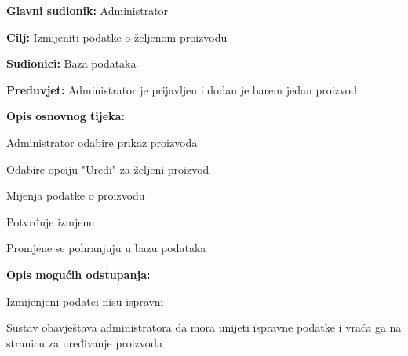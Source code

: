 					\noindent {}
					\begin{packed_item}
						
						\item \textbf{Glavni sudionik:} Administrator
						\item  \textbf{Cilj:} Izmijeniti podatke o željenom proizvodu
						\item  \textbf{Sudionici:} Baza podataka
						\item  \textbf{Preduvjet:} Administrator je prijavljen i dodan je barem jedan proizvod
						\item  \textbf{Opis osnovnog tijeka:}
						
						\item[] \begin{packed_enum}
							
							\item Administrator odabire prikaz proizvoda
							\item Odabire opciju "Uredi" za željeni proizvod
							\item Mijenja podatke o proizvodu
							\item Potvrđuje izmjenu
							\item Promjene se pohranjuju u bazu podataka
							
						\end{packed_enum}
						
						\item  \textbf{Opis mogućih odstupanja:}
						
						\item[] \begin{packed_item}
							
							\item[3.a] Izmijenjeni podatci nisu ispravni 
							\item[] \begin{packed_enum}
								
								\item Sustav obavještava administratora da mora unijeti ispravne podatke i vraća ga na stranicu za uređivanje proizvoda
							\end{packed_enum}
							
						\end{packed_item}	
						
					\end{packed_item}
				
